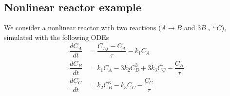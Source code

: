 \documentclass{article}
\begin{document}






\subsection{Nonlinear reactor example}
We consider a nonlinear reactor with 
two reactions ($A \rightarrow B $ and  $3B \rightleftharpoons C$),
simulated with the following ODEs
\begin{align*}
  \dfrac{dC_A}{dt} &= \dfrac{C_{Af} - C_A}{\tau} - k_1C_A\\
  \dfrac{dC_B}{dt} &= k_1C_A - 3k_2C^3_B + 3k_3C_C- \dfrac{C_B}{\tau}\\
  \dfrac{dC_C}{dt} &= k_2C^3_B - k_3C_C - \dfrac{C_C}{\tau}
\end{align*}
\end{document}
